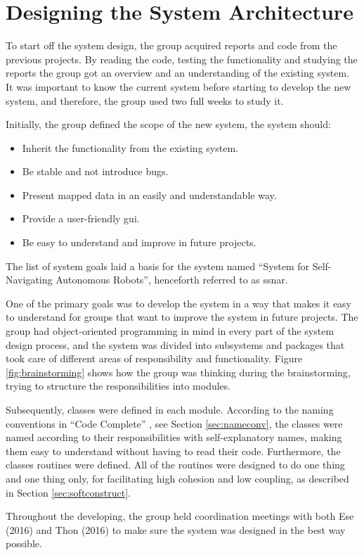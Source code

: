 \section{Designing the System Architecture}
To start off the system design, the group acquired reports and code from the previous projects. By reading the code, testing the functionality and studying the reports the group got an overview and an understanding of the existing system. It was important to know the current system before starting to develop the new system, and therefore, the group used two full weeks to study it.

Initially, the group defined the scope of the new system, the system should:
\begin{itemize}
    \item Inherit the functionality from the existing system.
    \item Be stable and not introduce bugs.
    \item Present mapped data in an easily and understandable way.
    \item Provide a user-friendly \acrshort{gui}.
    \item Be easy to understand and improve in future projects.
\end{itemize}
The list of system goals laid a basis for the system named ``System for Self-Navigating Autonomous Robots'', henceforth referred to as \acrshort{ssnar}.

One of the primary goals was to develop the system in a way that makes it easy to understand for groups that want to improve the system in future projects. The group had object-oriented programming in mind in every part of the system design process,  and the system was divided into subsystems and packages that took care of different areas of responsibility and functionality. Figure \ref{fig:brainstorming} shows how the group was thinking during the brainstorming, trying to structure the responsibilities into modules. 

Subsequently, classes were defined in each module. According to the naming conventions in ``Code Complete'' \cite{stevemcconnell2004}, see Section \ref{sec:nameconv}, the classes were named according to their responsibilities with self-explanatory names, making them easy to understand without having to read their code. Furthermore, the classes routines were defined. All of the routines were designed to do one thing and one thing only, for facilitating high cohesion and low coupling, as described in Section \ref{sec:softconstruct}.

Throughout the developing, the group held coordination meetings with both Ese (2016) and Thon (2016) to make sure the system was designed in the best way possible.
